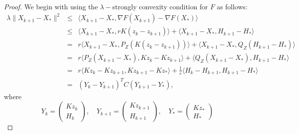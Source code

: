 \begin{proof}
We begin with using the $\lambda-$strongly convexity condition for $F$ as follows: 
\begin{eqnarray*}
\lambda \| X_{k+1} - X_* \|^2 &\leq& \langle X_{k+1} - X_*, \nabla F(X_{k+1}) - \nabla F(X_*)\rangle \\
&\leq& \langle X_{k+1} - X_*, r K(z_k - z_{k+1}) \rangle + \langle X_{k+1} - X_*, H_{k+1} - H_* \rangle \\
&=& r \langle X_{k+1} - X_*, P_Z (K(z_k - z_{k+1}))  \rangle + \langle X_{k+1} - X_*, Q_Z(H_{k+1} - H_*) \rangle \\
&=& r \langle  P_Z (X_{k+1} - X_*) , Kz_k - Kz_{k+1}   \rangle + \langle Q_Z (X_{k+1} - X_*), H_{k+1} - H_* \rangle  \\
&=& r \langle Kz_k - Kz_{k+1}, Kz_{k+1} - Kz_*  \rangle + \frac{1}{r} \langle H_{k} - H_{k+1}, H_{k+1} - H_* \rangle \\
&=& (Y_{k} - Y_{k+1})^T C (Y_{k+1} - Y_*),  
\end{eqnarray*}
where 
\begin{equation}
Y_k = \begin{pmatrix} 
      Kz_k \\
      H_k 
      \end{pmatrix}, \quad Y_{k+1} = \begin{pmatrix} 
      Kz_{k+1} \\
      H_{k+1}  
      \end{pmatrix}
,\quad Y_{*} = \begin{pmatrix} 
      Kz_{*} \\
      H_{*}  
      \end{pmatrix}
\end{equation}


\end{proof}
